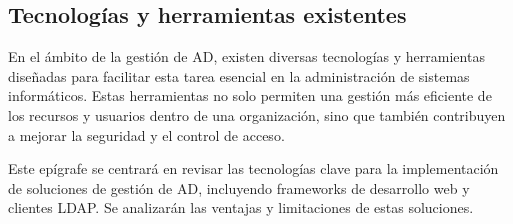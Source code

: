 \subsection{Tecnologías y herramientas existentes}

En el ámbito de la gestión de AD, existen diversas tecnologías y herramientas diseñadas para facilitar esta tarea esencial en la administración de sistemas informáticos. Estas herramientas no solo permiten una gestión más eficiente de los recursos y usuarios dentro de una organización, sino que también contribuyen a mejorar la seguridad y el control de acceso.

Este epígrafe se centrará en revisar las tecnologías clave para la implementación de soluciones de gestión de AD, incluyendo frameworks de desarrollo web y clientes LDAP. Se analizarán las ventajas y limitaciones de estas soluciones.

% 


